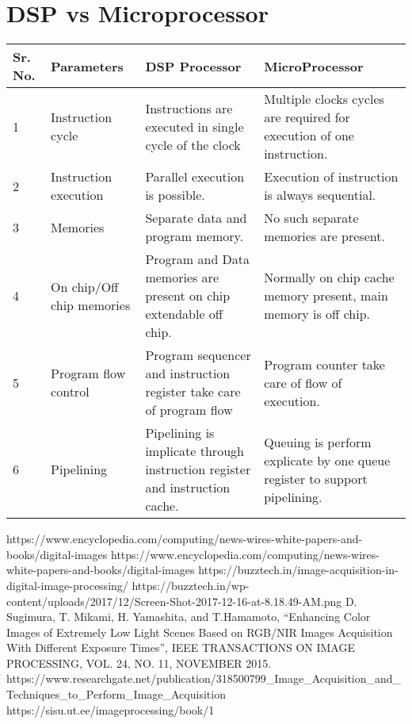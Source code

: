 \documentclass{article}
\begin{document}
    \section{DSP vs Microprocessor}
        \begin{tabular}{ ||p{1cm}|p{4cm}|p{6cm}|p{6cm}||}
            \hline
            \textbf{Sr. No.}&\textbf{Parameters}&\textbf{DSP Processor}&\textbf{MicroProcessor}\\
            \hline
            1&Instruction cycle&Instructions are executed in single cycle of the clock&Multiple clocks cycles are required for execution of one instruction.\\\hline
            2&Instruction execution&Parallel execution is possible.&Execution of instruction is always sequential.\\\hline
            3&Memories&Separate data and program memory.&No such separate memories are present.\\\hline
            4&On chip/Off chip memories&Program and Data memories are present on chip extendable off chip.&Normally on chip cache memory present, main memory is off chip.\\\hline
            5&Program flow control&Program sequencer and instruction register take care of program flow&Program counter take care of flow of execution.\\\hline
            6&Pipelining&Pipelining is implicate through instruction register and instruction cache.&Queuing is perform explicate by one queue register to support pipelining.\\
            \hline
        \end{tabular}

    \begin{thebibliography}{9}
	 https://www.encyclopedia.com/computing/news-wires-white-papers-and-books/digital-images
	 https://www.encyclopedia.com/computing/news-wires-white-papers-and-books/digital-images
	 https://buzztech.in/image-acquisition-in-digital-image-processing/
	     https://buzztech.in/wp-content/uploads/2017/12/Screen-Shot-2017-12-16-at-8.18.49-AM.png
     D. Sugimura, T. Mikami, H. Yamashita, and T.Hamamoto, “Enhancing Color Images of Extremely Low Light Scenes Based on RGB/NIR Images Acquisition With Different Exposure Times”, IEEE TRANSACTIONS ON IMAGE PROCESSING, VOL. 24, NO. 11, NOVEMBER 2015.
     https://www.researchgate.net/publication/318500799_Image_Acquisition_and_Techniques_to_Perform_Image_Acquisition
     https://sisu.ut.ee/imageprocessing/book/1
    
    \end{thebibliography}
\end{document}
